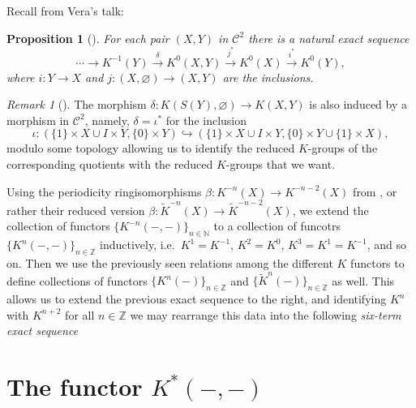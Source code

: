 \documentclass[12pt,a4paper]{amsart}
\theoremstyle{plain}
\newtheorem{prop}[thm]{Proposition}
\theoremstyle{definition}
\theoremstyle{remark}
\newtheorem{rem}[thm]{Remark}
\begin{document}
Recall from Vera's talk:

\begin{prop}[{\cite[Proposition 2.4.4]{ati67}}]
  For each pair $(X,Y)$ in $\mathcal{C}^{2}$ there is a natural exact sequence
  \[ \cdots \to K^{-1}(Y) \xrightarrow{\delta} K^{0}(X,Y) \xrightarrow{j^{*}} K^{0}(X) \xrightarrow{i^{*}} K^{0}(Y), \]
  where $i \colon Y \to X$ and $j \colon (X,\varnothing) \to (X,Y)$ are the inclusions.
\end{prop}

\begin{rem}[{\cite[p.~87]{ati67}}]
  The morphism $\delta \colon K(S(Y),\varnothing) \to K(X,Y)$ is also induced by a morphism in $\mathcal{C}^{2}$, namely, $\delta = \iota^{*}$ for the inclusion
  \[ \iota \colon (\{1\} \times X \cup I \times Y, \{0\} \times Y ) \hookrightarrow (\{1 \} \times X \cup I \times Y, \{ 0\} \times Y \cup \{1 \} \times X), \]
  modulo some topology allowing us to identify the reduced $K$-groups of the corresponding quotients with the reduced $K$-groups that we want.
\end{rem}

Using the periodicity ringisomorphisms $\beta \colon K^{-n}(X) \to K^{-n-2}(X)$ from \cite[Theorem 2.4.9]{ati67}, or rather their reduced version $\beta \colon \tilde{K}^{-n}(X) \to \tilde{K}^{-n-2}(X)$, we extend the collection of functors $\{ K^{-n}(-,-) \}_{n \in \mathbb{N}}$ to a collection of funcotrs $\{ K^{n}(-,-) \}_{n \in \mathbb{Z}}$ inductively, i.e.~$K^{1} = K^{-1}$, $K^{2} = K^{0}$, $K^{3} =K^{1} = K^{-1}$, and so on.
Then we use the previously seen relations among the different $K$ functors to define collections of functors $\{ K^{n}(-) \}_{n \in \mathbb{Z}}$ and $\{ \tilde{K}^{n}(-) \}_{n \in \mathbb{Z}}$ as well.
This allows us to extend the previous exact sequence to the right, and identifying $K^{n}$ with $K^{n+2}$ for all $n \in \mathbb{Z}$ we may rearrange this data into the following \textit{six-term exact sequence}

\begin{center}
\end{center}

\section{The functor $K^{*}(-,-)$}
\end{document}
